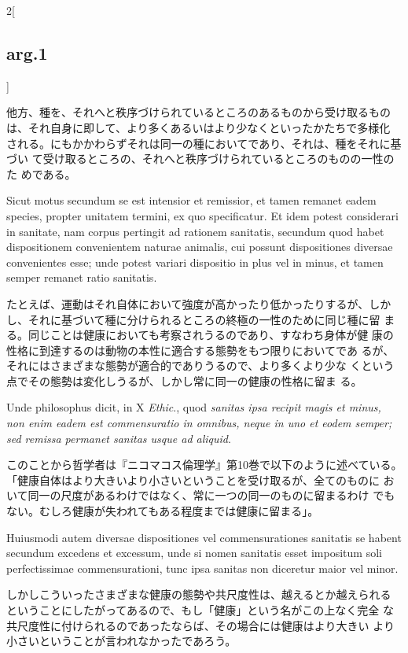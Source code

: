 \documentclass[paper=a4paper,fontsize=10pt,jafontsize=9pt,titlepage]{jlreq}
\begin{document}
\begin{paracol}{2}[\subsection{arg.1}]
\switchcolumn

他方、種を、それへと秩序づけられているところのあるものから受け取るもの
は、それ自身に即して、より多くあるいはより少なくといったかたちで多様化
される。にもかかわらずそれは同一の種においてであり、それは、種をそれに基づい
て受け取るところの、それへと秩序づけられているところのものの一性のた
めである。

\switchcolumn*

Sicut motus
secundum se est intensior et remissior, et tamen remanet eadem
species, propter unitatem termini, ex quo specificatur. Et idem potest
considerari in sanitate, nam corpus pertingit ad rationem sanitatis,
secundum quod habet dispositionem convenientem naturae animalis, cui
possunt dispositiones diversae convenientes esse; unde potest variari
dispositio in plus vel in minus, et tamen semper remanet ratio
sanitatis.

\switchcolumn

たとえば、運動はそれ自体において強度が高かったり低かったりするが、しか
 し、それに基づいて種に分けられるところの終極の一性のために同じ種に留
 まる。同じことは健康においても考察されうるのであり、すなわち身体が健
 康の性格に到達するのは動物の本性に適合する態勢をもつ限りにおいてであ
 るが、それにはさまざまな態勢が適合的でありうるので、より多くより少な
 くという点でその態勢は変化しうるが、しかし常に同一の健康の性格に留ま
 る。

\switchcolumn*

Unde philosophus dicit, in X {\itshape Ethic}., quod {\itshape sanitas ipsa
recipit magis et minus, non enim eadem est commensuratio in omnibus,
neque in uno et eodem semper; sed remissa permanet sanitas usque ad
aliquid}.

\switchcolumn

このことから哲学者は『ニコマコス倫理学』第10巻で以下のように述べている。
 「健康自体はより大きいより小さいということを受け取るが、全てのものに
 おいて同一の尺度があるわけではなく、常に一つの同一のものに留まるわけ
 でもない。むしろ健康が失われてもある程度までは健康に留まる」。

\switchcolumn*

Huiusmodi autem diversae dispositiones vel commensurationes
sanitatis se habent secundum excedens et excessum, unde si nomen
sanitatis esset impositum soli perfectissimae commensurationi, tunc
ipsa sanitas non diceretur maior vel minor.

\switchcolumn

しかしこういったさまざまな健康の態勢や共尺度性は、越えるとか越えられる
 ということにしたがってあるので、もし「健康」という名がこの上なく完全
 な共尺度性に付けられるのであったならば、その場合には健康はより大きい
 より小さいということが言われなかったであろう。


\end{paracol}
\end{document}
